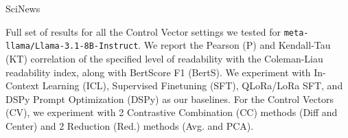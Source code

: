 \begin{table}[!ht]
\begin{subtable}[t]{0.45\textwidth}
\caption{SciNews}
\label{tab:main-results-llama-scinews}
\end{subtable}
\caption[Full set of results for all the Control Vector settings we tested for \texttt{meta-llama/Llama-3.1-8B-Instruct}.]{Full set of results for all the Control Vector settings we tested for \texttt{meta-llama/Llama-3.1-8B-Instruct}. We report the Pearson (P) and Kendall-Tau (KT) correlation of the specified level of readability with the Coleman-Liau readability index, along with BertScore F1 (BertS). We experiment with In-Context Learning (ICL), Supervised Finetuning (SFT), QLoRa/LoRa SFT, and DSPy Prompt Optimization (DSPy) as our baselines. For the Control Vectors (CV), we experiment with 2 Contrastive Combination (CC) methods (Diff and Center) and 2 Reduction (Red.) methods (Avg. and PCA).}
\label{tab:main-results-llama}
\end{table}


